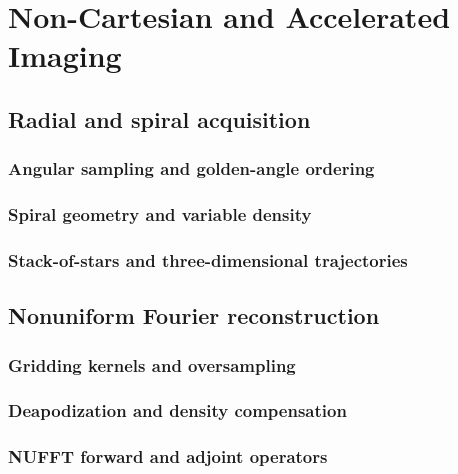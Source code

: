 \chapter{Non-Cartesian and Accelerated Imaging}
\label{ch:15}

\section{Radial and spiral acquisition}
\label{sec:15:radial-and-spiral-acquisition}
\subsection{Angular sampling and golden-angle ordering}
\subsection{Spiral geometry and variable density}
\subsection{Stack-of-stars and three-dimensional trajectories}

\section{Nonuniform Fourier reconstruction}
\label{sec:15:nonuniform-fourier-reconstruction}
\subsection{Gridding kernels and oversampling}
\subsection{Deapodization and density compensation}
\subsection{NUFFT forward and adjoint operators}

